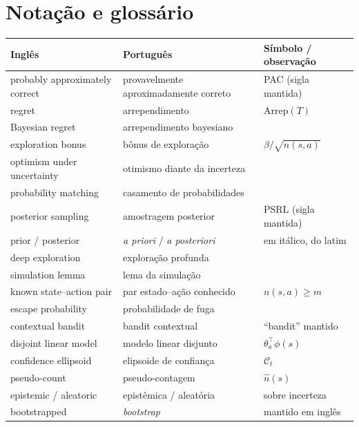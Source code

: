 \documentclass[11pt, a4paper]{article}
\newcommand{\feat}{\phi}
\begin{document}
\section{Notação e glossário}

\begin{center}\small
\begin{tabular}{@{}lll@{}}
\toprule
\textbf{Inglês} & \textbf{Português} & \textbf{Símbolo / observação} \\
\midrule
probably approximately correct & provavelmente aproximadamente correto & PAC (sigla mantida) \\
regret & arrependimento & $\mathrm{Arrep}(T)$ \\
Bayesian regret & arrependimento bayesiano & \\
exploration bonus & bônus de exploração & $\beta/\sqrt{n(s,a)}$ \\
optimism under uncertainty & otimismo diante da incerteza & \\
probability matching & casamento de probabilidades & \\
posterior sampling & amostragem posterior & PSRL (sigla mantida) \\
prior / posterior & \textit{a priori} / \textit{a posteriori} & em itálico, do latim \\
deep exploration & exploração profunda & \\
simulation lemma & lema da simulação & \\
known state--action pair & par estado--ação conhecido & $n(s,a) \ge m$ \\
escape probability & probabilidade de fuga & \\
contextual bandit & bandit contextual & ``bandit'' mantido \\
disjoint linear model & modelo linear disjunto & $\theta_a^{\!\top}\feat(s)$ \\
confidence ellipsoid & elipsoide de confiança & $\mathcal{C}_t$ \\
pseudo-count & pseudo-contagem & $\hat n(s)$ \\
epistemic / aleatoric & epistêmica / aleatória & sobre incerteza \\
bootstrapped & \textit{bootstrap} & mantido em inglês \\
\bottomrule
\end{tabular}
\end{center}

\end{document}
